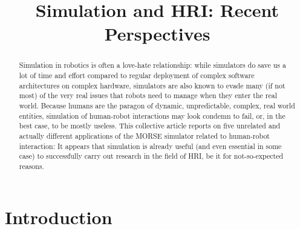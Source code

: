 \documentclass[conference]{IEEEtran}
\begin{document}
\title{Simulation and HRI: Recent Perspectives}

\author{}


\maketitle

\begin{abstract}

Simulation in robotics is often a love-hate relationship: while simulators do
save us a lot of time and effort compared to regular deployment of complex
software architectures on complex hardware, simulators are also known to evade
many (if not most) of the very real issues that robots need to manage when they
enter the real world.  Because humans are the paragon of dynamic, unpredictable,
complex, real world entities, simulation of human-robot interactions may look
condemn to fail, or, in the best case, to be mostly useless.  This collective
article reports on five unrelated and actually different applications of the
MORSE simulator related to human-robot interaction: It appears that simulation
is already useful (and even essential in some case) to successfully carry out
research in the field of HRI, be it for not-so-expected reasons.

\end{abstract}

\IEEEpeerreviewmaketitle

\section{Introduction}
\end{document}
